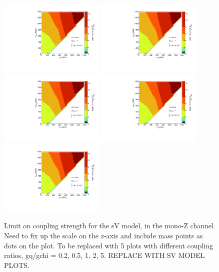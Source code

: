 \begin{figure}
\begin{center}
\includegraphics[width=0.45\textwidth]{figures/coupling_limits_TSD_1.pdf}
\includegraphics[width=0.45\textwidth]{figures/coupling_limits_TSD_1.pdf}
\includegraphics[width=0.45\textwidth]{figures/coupling_limits_TSD_1.pdf}
\includegraphics[width=0.45\textwidth]{figures/coupling_limits_TSD_1.pdf}
\includegraphics[width=0.45\textwidth]{figures/coupling_limits_TSD_1.pdf}
\caption{Limit on coupling strength for the sV model, in the mono-Z channel.  Need to fix up the scale on the z-axis and include mass points as dots on the plot. To be replaced with 5 plots with different coupling ratios, gq/gchi = 0.2, 0.5, 1, 2, 5. REPLACE WITH SV MODEL PLOTS.}
\label{fig:MonoZ_SVD_couplinglimit}
\end{center}
\end{figure}

